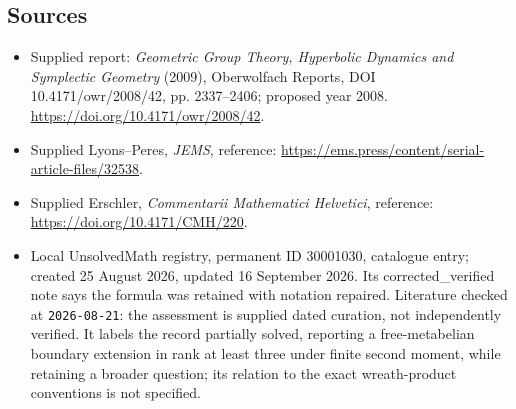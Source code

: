 \documentclass[11pt]{article}
\begin{document}
\subsection{Sources}
\begin{itemize}
\item Supplied report: \emph{Geometric Group Theory, Hyperbolic Dynamics and Symplectic Geometry} (2009), Oberwolfach Reports, DOI 10.4171/owr/2008/42, pp. 2337--2406; proposed year 2008. \url{https://doi.org/10.4171/owr/2008/42}.
\item Supplied Lyons--Peres, \emph{JEMS}, reference: \url{https://ems.press/content/serial-article-files/32538}.
\item Supplied Erschler, \emph{Commentarii Mathematici Helvetici}, reference: \url{https://doi.org/10.4171/CMH/220}.
\item Local UnsolvedMath registry, permanent ID 30001030, catalogue entry; created 25 August 2026, updated 16 September 2026. Its corrected\_verified note says the formula was retained with notation repaired. Literature checked at \texttt{2026-08-21}: the assessment is supplied dated curation, not independently verified. It labels the record partially solved, reporting a free-metabelian boundary extension in rank at least three under finite second moment, while retaining a broader question; its relation to the exact wreath-product conventions is not specified.
\end{itemize}
\end{document}
